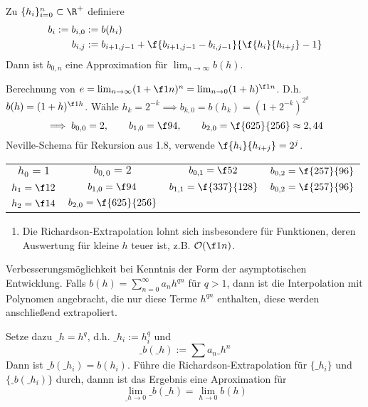 \documentclass[a4paper,11pt]{scrartcl}
\begin{document}
\begin{df} \label{1.8}
	Zu $\{h_i\}_{i=0}^n \subset \R^+$ definiere
	\begin{align*}
		b_i := b_{i,0} &:= b(h_i)\\
		b_{i,j} &:= b_{i+1,j-1} + \f {b_{i+1,j-1}-b_{i,j-1}}{\f {h_i}{h_{i+j}}-1}
	\end{align*}
	Dann ist $b_{0,n}$ eine Approximation für $\lim_{n\to \infty} b(h)$.
\end{df}

\begin{ex*}
	Berechnung von $e=\lim_{n\to \infty} (1 +\f 1n)^n = \lim_{n\to 0} (1+h)^{\f 1n}$.
	D.h. $b(h)=(1+h)^{\f 1h}$.
	Wähle $h_k=2^{-k} \implies b_{k,0}=b(h_k) = (1+2^{-k})^{2^k}$
	\[
		\implies b_{0,0} = 2, \qquad b_{1,0} = \f 94, \qquad b_{2,0} = \f {625}{256} \approx 2,44
	\]
	Neville-Schema für Rekursion aus 1.8, verwende $\f {h_i}{h_{i+j}} = 2^j$.
	\begin{table}[h]
		\centering
		\begin{tabular}{c|ccc}
			$h_0=1$ & $b_{0,0}=2$  & $b_{0,1}=\f 52$ & $b_{0,2}=\f {257}{96}$\\
			$h_1=\f12$ & $b_{1,0}=\f 94$  & $b_{1,1}=\f {337}{128}$ & $b_{0,2}=\f {257}{96}$\\
			$h_2=\f14$ & $b_{2,0}=\f {625}{256}$  \\
		\end{tabular}
	\end{table}
\end{ex*}

\begin{note}
	\begin{enumerate}
		\item 
			Die Richardson-Extrapolation lohnt sich insbesondere für Funktionen, deren Auswertung für kleine $h$ teuer ist, z.B. $\mathcal O(\f 1n)$.
	\end{enumerate}
\end{note}

\begin{note}
	Verbesserungsmöglichkeit bei Kenntnis der Form der asymptotischen Entwicklung.
	Falls $b(h) = \sum_{n=0}^\infty a_nh^{qn}$ für $q>1$, dann ist die Interpolation mit Polynomen angebracht, die nur diese Terme $h^{qn}$ enthalten, diese werden anschließend extrapoliert.

	Setze dazu $\_h = h^q$, d.h. $\_{h_{i}}:= h_i^q$ und
	\[
		\_b(\_h) := \sum a_n\_h^n
	\]
	Dann ist $\_b(\_h_i) = b(h_i)$.
	Führe die Richardson-Extrapolation für $\{\_h_i\}$ und $\{\_b(\_h_i)\}$ durch, dannn ist das Ergebnis eine Aproximation für
	\[
		\lim_{\_h\to 0}\_b(\_h) = \lim_{h\to 0}b(h)
	\]
\end{note}
\end{document}
